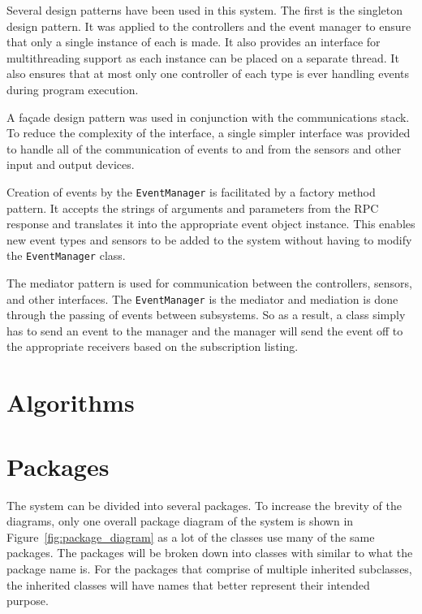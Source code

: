 \documentclass{report}
\begin{document}
Several design patterns have been used in this system. The first is the
singleton design pattern. It was applied to the controllers and the event
manager to ensure that only a single instance of each is made. It also provides
an interface for multithreading support as each instance can be placed on a
separate thread. It also ensures that at most only one controller of each type
is ever handling events during program execution.

A fa\c{c}ade design pattern was used in conjunction with the communications
stack. To reduce the complexity of the interface, a single simpler interface
was provided to handle all of the communication of events to and from the
sensors and other input and output devices.

Creation of events by the \texttt{EventManager} is facilitated by a factory
method pattern. It accepts the strings of arguments and parameters from the RPC
response and translates it into the appropriate event object instance. This
enables new event types and sensors to be added to the system without having to
modify the \texttt{EventManager} class.

The mediator pattern is used for communication between the controllers,
sensors, and other interfaces. The \texttt{EventManager} is the mediator and
mediation is done through the passing of events between subsystems. So as a
result, a class simply has to send an event to the manager and the manager will
send the event off to the appropriate receivers based on the subscription
listing.

\section{Algorithms}

\section{Packages}
The system can be divided into several packages. To increase the brevity of the
diagrams, only one overall package diagram of the system is shown in
Figure~\ref{fig:package_diagram} as a lot of the classes use many of the same
packages. The packages will be broken down into classes with similar to what
the package name is. For the packages that comprise of multiple inherited
subclasses, the inherited classes will have names that better represent their
intended purpose.
\end{document}
